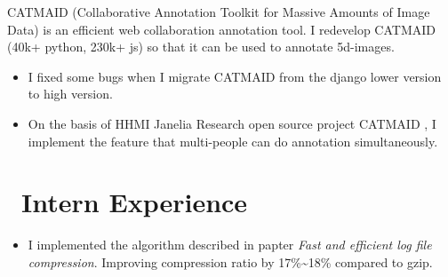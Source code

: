 \documentclass{resume}
\begin{document}
CATMAID (Collaborative Annotation Toolkit for Massive Amounts of Image Data) is an efficient web collaboration annotation tool. I redevelop CATMAID (40k+ python, 230k+ js) so that it can be used to annotate 5d-images.%
\begin{itemize}
  \item I fixed some bugs when I migrate CATMAID from the django lower version to high version.
  \item On the basis of HHMI Janelia Research open source project CATMAID , I implement the feature that multi-people can do annotation simultaneously.
\end{itemize}

\section{\faSitemap\ Intern Experience}

\begin{itemize}
    \item I implemented the algorithm described in papter \emph{Fast and efficient log file compression}. Improving compression ratio by 17\%\textasciitilde18\% compared to gzip.
\end{itemize}
\end{document}
